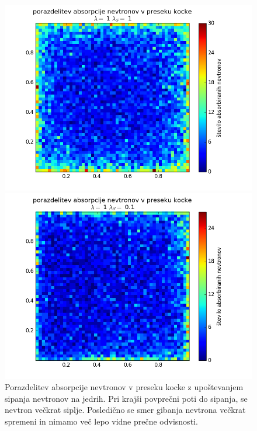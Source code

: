 \documentclass[slovene,11pt,a4paper]{article}
\numberwithin{equation}{section} %
\numberwithin{figure}{section} %
\numberwithin{table}{section} %
\begin{document}
\begin{figure}[!htb]
\centering
\begin{minipage}{0.5\textwidth}
\centering
\includegraphics[scale=0.45]{slike/porazdelitev_lambda_s_1lamda_1n_100000.png}
\end{minipage}\hfill
\begin{minipage}{0.5\textwidth}
\centering
\includegraphics[scale=0.45]{slike/porazdelitev_lambda_s_0_1lamda_1n_100000.png}
\end{minipage}
\caption{Porazdelitev absorpcije nevtronov v preseku kocke z upoštevanjem sipanja nevtronov na jedrih. Pri krajši povprečni poti do sipanja, se nevtron večkrat siplje. Posledično se smer gibanja nevtrona večkrat spremeni in nimamo več lepo vidne prečne odvisnosti.}
\end{figure}
\end{document}
